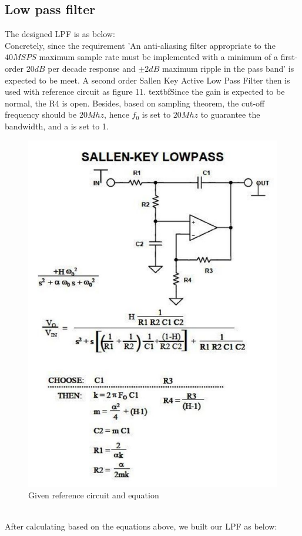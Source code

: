 \documentclass[pdftex,12pt,a4paper]{article}
\begin{document}
\subsection{Low pass filter}
The designed LPF is as below:
~\\Concretely, since the requirement 'An anti-aliasing filter appropriate to the $40MSPS$ maximum sample rate must be implemented with a minimum of a first-order $20dB$ per decade response and $\pm 2dB$ maximum ripple in the pass band' is expected to be meet. A second order Sallen Key Active Low Pass Filter then is used with reference circuit as figure 11. textbf{Since the gain is expected to be normal, the R4 is open.} Besides, based on sampling theorem, the cut-off frequency should be $20Mhz$, hence $f_0$ is set to $20Mhz$ to guarantee the bandwidth, and a is set to 1. 
\begin{figure}[H]
\centering
\includegraphics[width=12cm]{reff.png}
\caption{Given reference circuit and equation}
\end{figure}
~\\ After calculating based on the equations above, we built our LPF as below:
\end{document}
